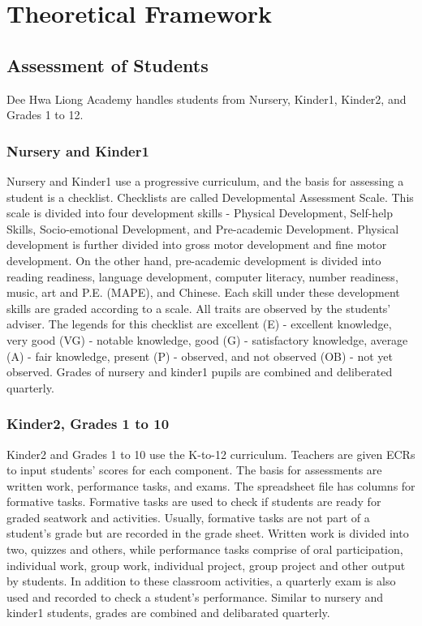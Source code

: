 \documentclass[11pt,a4paper,titlepage]{article}
\let\stdsection\section
\renewcommand\section{\newpage\stdsection}
\begin{document}
\section{Theoretical Framework}

\subsection{Assessment of Students}
Dee Hwa Liong Academy handles students from Nursery, Kinder1, Kinder2, and Grades 1 to 12.

\subsubsection{Nursery and Kinder1}
Nursery and Kinder1 use a progressive curriculum, and the basis for assessing a student is a checklist. Checklists are called Developmental Assessment Scale. This scale is divided into four development skills - Physical Development, Self-help Skills, Socio-emotional Development, and Pre-academic Development. Physical development is further divided into gross motor development and fine motor development. On the other hand, pre-academic development is divided into reading readiness, language development, computer literacy, number readiness, music, art and P.E. (MAPE), and Chinese. Each skill under these development skills are graded according to a scale. All traits are observed by the students' adviser. The legends for this checklist are excellent (E) - excellent knowledge, very good (VG) - notable knowledge, good (G) - satisfactory knowledge, average (A) - fair knowledge, present (P) - observed, and not observed (OB) - not yet observed. Grades of nursery and kinder1 pupils are combined and deliberated quarterly.

\subsubsection{Kinder2, Grades 1 to 10}
Kinder2 and Grades 1 to 10 use the K-to-12 curriculum. Teachers are given ECRs to input students' scores for each component. The basis for assessments are written work, performance tasks, and exams. The spreadsheet file has columns for formative tasks. Formative tasks are used to check if students are ready for graded seatwork and activities. Usually, formative tasks are not part of a student's grade but are recorded in the grade sheet. Written work is divided into two, quizzes and others, while performance tasks comprise of oral participation, individual work, group work, individual project, group project and other output by students. In addition to these classroom activities, a quarterly exam is also used and recorded to check a student's performance. Similar to nursery and kinder1 students, grades are combined and delibarated quarterly.
\end{document}
